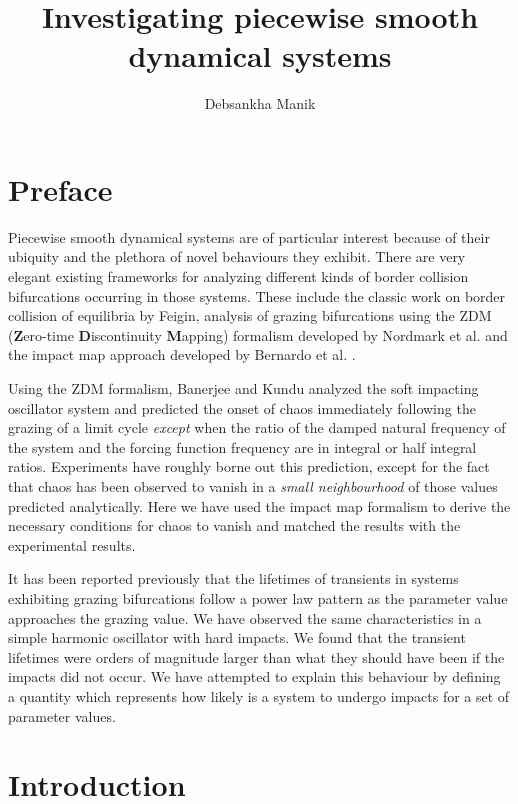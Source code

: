 \documentclass{book}
\renewcommand{\(}{\begin{columns}}
\renewcommand{\)}{\end{columns}}
\newcommand{\<}[1]{\begin{column}{#1}}
\renewcommand{\>}{\end{column}}
\newcommand{\bb}[1]{\textbf{#1}}
\begin{document}
\title{Investigating piecewise smooth dynamical systems}
\author{Debsankha Manik}
\maketitle

\frontmatter
\chapter{Preface}
Piecewise smooth dynamical systems are of particular interest because of their 
ubiquity and the plethora of novel behaviours they exhibit.  There are very elegant existing frameworks
for analyzing different kinds of border collision bifurcations occurring in those systems.
These include the classic work on border collision of equilibria by Feigin\cite{feigin-1970}, analysis of grazing 
bifurcations using the ZDM (\bb{Z}ero-time \bb{D}iscontinuity \bb{M}apping) formalism developed by Nordmark et al. \cite{dm-orig-nordmark} and the impact map 
approach developed by Bernardo et al. \cite[p.~10]{bernardo-book}.

Using the ZDM formalism, Banerjee and Kundu analyzed the soft impacting oscillator system
and predicted the onset of chaos immediately following the grazing of a limit 
cycle \emph{except} when the ratio of the damped natural frequency of the 
system and the forcing function frequency are in integral or half integral 
ratios.  Experiments have roughly borne out this prediction, except for the 
fact that chaos has been observed to vanish in a \emph{small neighbourhood} of 
those values predicted analytically.  Here we have used the impact map formalism to 
derive the necessary conditions for chaos to vanish and matched the results with the 
experimental results.  

It has been reported previously that the lifetimes of transients in  systems 
exhibiting grazing bifurcations follow a power law pattern as the parameter 
value approaches the grazing value.  We have observed the same characteristics 
in a simple harmonic oscillator with hard impacts. We found that the transient 
lifetimes were orders of magnitude larger than what they should have been
if the impacts did not occur.   We have attempted to explain this 
behaviour by defining a quantity which represents how likely is a system to 
undergo impacts for a set of parameter values.  

\tableofcontents

\mainmatter
\chapter{Introduction}
\end{document}
